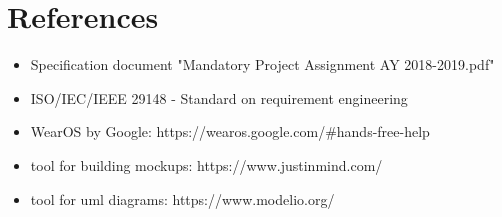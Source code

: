 \chapter{References}

\begin{itemize}
\item Specification document "Mandatory Project Assignment AY 2018-2019.pdf"
\item ISO/IEC/IEEE 29148 - Standard on requirement engineering
\item WearOS by Google: https://wearos.google.com/#hands-free-help
\item tool for building mockups: https://www.justinmind.com/
\item tool for uml diagrams: https://www.modelio.org/
\end{itemize}